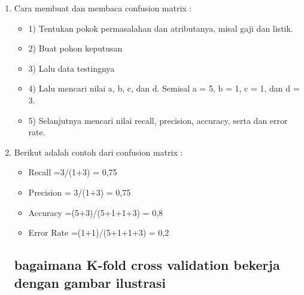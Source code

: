 \begin{enumerate}
\item Cara membuat dan membaca confusion matrix :
\begin{itemize}
\item 1) Tentukan pokok permasalahan dan atributanya, misal gaji dan listik.
\item 2) Buat pohon keputusan
\item 3) Lalu data testingnya
\item 4) Lalu mencari nilai a, b, c, dan d. Semisal a = 5, b = 1, c = 1, dan d = 3.
\item 5) Selanjutnya mencari nilai recall, precision, accuracy, serta dan error rate.
\end{itemize}
\item Berikut adalah contoh dari confusion matrix :
\begin{itemize}
\item Recall =3/(1+3) = 0,75
\item Precision = 3/(1+3) = 0,75
\item Accuracy =(5+3)/(5+1+1+3) = 0,8
\item Error Rate =(1+1)/(5+1+1+3) = 0,2
\end{itemize}

\subsection{bagaimana K-fold cross validation bekerja dengan gambar ilustrasi}


\end{enumerate}
